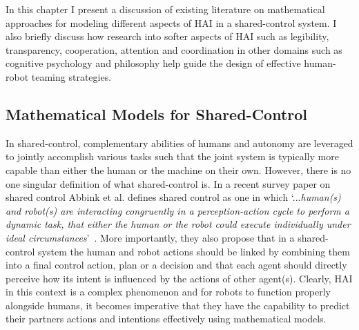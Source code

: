 \documentclass[12pt]{article}
\newcommand{\DGc}[1]{{\textbf{\color{blue}{#1}}}}
\begin{document}
In this chapter I present a discussion of existing literature on mathematical approaches for modeling different aspects of HAI in a shared-control system.  
I also briefly discuss how research into softer aspects of HAI such as legibility, transparency, cooperation, attention and coordination in other domains such as cognitive psychology and philosophy help guide the design of effective human-robot teaming strategies. 


\subsection{Mathematical Models for Shared-Control}
In shared-control, complementary abilities of humans and autonomy are leveraged to jointly accomplish various tasks such that the joint system is typically more capable than either the human or the machine on their own. However, there is no one singular definition of what shared-control is. In a recent survey paper on shared control Abbink et al. defines shared control as one in which `...\textit{human(s) and robot(s) are interacting congruently in a perception-action cycle to perform a dynamic task, that either the human or the robot could execute individually under ideal circumstances}'~\cite{abbink2018topology}. More importantly, they also propose that in a shared-control system the human and robot actions should be linked by combining them into a final control action, plan or a decision and that each agent should directly perceive how its intent is influenced by the actions of other agent(s). Clearly, HAI in this context is a complex phenomenon and for robots to function properly alongside humans, it becomes imperative that they have the capability to predict their partners actions and intentions effectively using mathematical models. 
\end{document}

